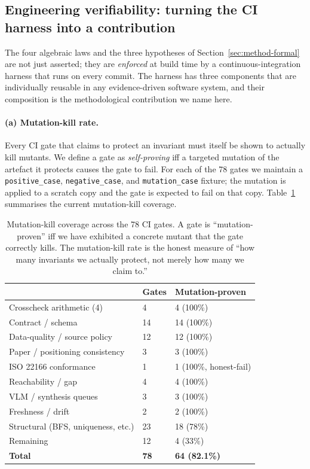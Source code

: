 \documentclass[review]{elsarticle}
\begin{document}
\subsection{Engineering verifiability: turning the CI harness into a contribution}\label{sec:eng-verif}

The four algebraic laws and the three hypotheses of Section~\ref{sec:method-formal}
are not just asserted; they are \emph{enforced} at build time by a
continuous-integration harness that runs on every commit. The harness has
three components that are individually reusable in any evidence-driven
software system, and their composition is the methodological
contribution we name here.

\paragraph{(a) Mutation-kill rate.}
Every CI gate that claims to protect an invariant must itself be shown
to actually kill mutants. We define a gate as
\emph{self-proving} iff a targeted mutation of the artefact it protects
causes the gate to fail. For each of the 78 gates we maintain a
\texttt{positive\_case}, \texttt{negative\_case}, and
\texttt{mutation\_case} fixture; the mutation is applied to a scratch
copy and the gate is expected to fail on that copy. Table~\ref{tab:mutation}
summarises the current mutation-kill coverage.

\begin{table}[h]
\centering
\caption{Mutation-kill coverage across the 78 CI gates. A gate is
``mutation-proven'' iff we have exhibited a concrete mutant that the
gate correctly kills. The mutation-kill rate is the honest measure of
``how many invariants we actually protect, not merely how many we
claim to.''}
\label{tab:mutation}
\begin{tabular}{lll}
\hline
& Gates & Mutation-proven \\
\hline
Crosscheck arithmetic (4) & 4 & 4 (100\%) \\
Contract / schema & 14 & 14 (100\%) \\
Data-quality / source policy & 12 & 12 (100\%) \\
Paper / positioning consistency & 3 & 3 (100\%) \\
ISO 22166 conformance & 1 & 1 (100\%, honest-fail) \\
Reachability / gap & 4 & 4 (100\%) \\
VLM / synthesis queues & 3 & 3 (100\%) \\
Freshness / drift & 2 & 2 (100\%) \\
Structural (BFS, uniqueness, etc.) & 23 & 18 (78\%) \\
Remaining & 12 & 4 (33\%) \\
\hline
\textbf{Total} & \textbf{78} & \textbf{64 (82.1\%)} \\
\hline
\end{tabular}
\end{table}
\end{document}
